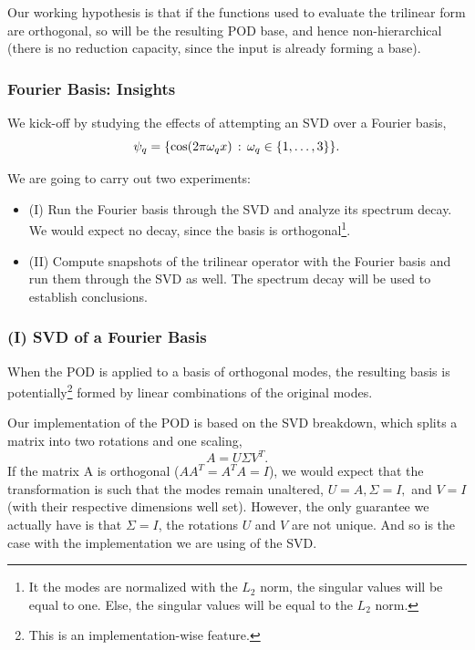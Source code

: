 \documentclass[../../thesis.tex]{subfiles}
\begin{document}
Our working hypothesis is that if the functions used to evaluate the 
trilinear form are orthogonal, so will be the resulting POD base,
and hence non-hierarchical 
(there is no reduction capacity, since the input is already forming a base).

\subsubsection{Fourier Basis: Insights}
We kick-off by studying the effects of attempting an SVD over a Fourier basis, 
\begin{equation}
    \psi_q = \qty{\cos(2 \pi \omega_q x) \, : \, \omega_q \in \qty{1, \ldots, 3}}.
\end{equation}

We are going to carry out two experiments:
\begin{itemize}
    \item (I) Run the Fourier basis through the SVD and analyze its spectrum decay. 
    We would expect no decay, since the basis is orthogonal\footnote{
        It the modes are normalized with the $L_2$ norm, 
        the singular values will be equal to one.
        Else, the singular values will be equal to the $L_2$ norm.
    }.
    \item (II) Compute snapshots of the trilinear operator with the Fourier basis
    and run them through the SVD as well.
    The spectrum decay will be used to establish conclusions. 
\end{itemize}

\subsubsection{(I) SVD of a Fourier Basis}
When the POD is applied to a basis of orthogonal modes, 
the resulting basis is potentially\footnote{
    This is an implementation-wise feature.
} formed 
by linear combinations of the original modes.

Our implementation of the POD is based on the SVD breakdown, which splits a matrix into 
two rotations and one scaling,
\begin{equation}
    A = U \Sigma V^T.
\end{equation}
If the matrix A is orthogonal ($AA^T = A^T A = I$),
we would expect that the transformation is such that the modes
remain unaltered,
$U=A, \Sigma = I,$ and $V=I$ 
(with their respective dimensions well set).
However, the only guarantee we actually have is that $\Sigma = I$,
the rotations $U$ and $V$ are not unique.
And so is the case with the implementation we are using of the SVD.
\end{document}
